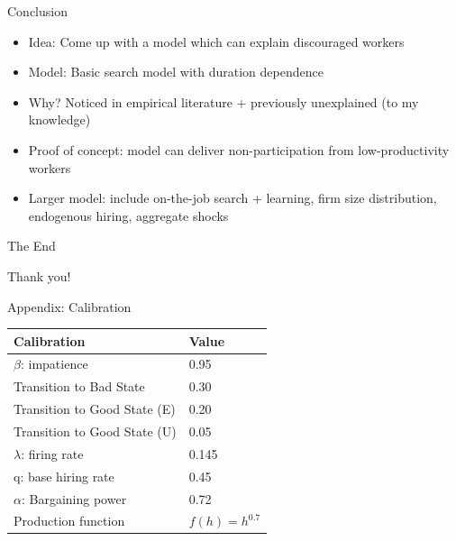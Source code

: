 \documentclass[lualatex]{beamer}
\begin{document}
\begin{frame}{Conclusion}
\begin{itemize}
	\item Idea: Come up with a model which can explain discouraged workers

	\item Model: Basic search model with duration dependence

	\item Why? Noticed in empirical literature + previously unexplained (to my knowledge)

	\item Proof of concept: model can deliver non-participation from low-productivity workers

	\item Larger model: include on-the-job search + learning, firm size distribution, endogenous hiring, aggregate shocks

\end{itemize}
\end{frame}

\begin{frame}[plain, c]{The End}
\huge
\begin{center}
Thank you!
\end{center}
\end{frame}

\begin{frame}{Appendix: Calibration}

	\begin{table}[]
	\begin{tabular}{|l|l|}
	\hline
	Calibration                  & Value            \\ \hline
	$\beta$: impatience          & 0.95             \\ \hline
	Transition to Bad State      & 0.30             \\ \hline
	Transition to Good State (E) & 0.20             \\ \hline
	Transition to Good State (U) & 0.05             \\ \hline
	$\lambda$: firing rate       & 0.145            \\ \hline
	q: base hiring rate          & 0.45             \\ \hline
	$\alpha$: Bargaining power   & 0.72             \\ \hline
	Production function          & $f(h) = h^{0.7}$ \\ \hline
	\end{tabular}
	\end{table}

\end{frame}
\end{document}
